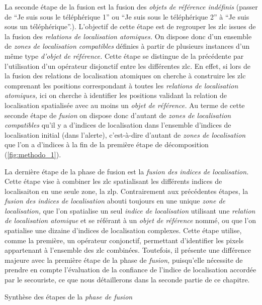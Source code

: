 La seconde étape de la fusion est la fusion des \emph{objets de
  référence indéfinis} (\eg passer de \enquote{Je suis sous le
  téléphérique 1} ou \enquote{Je suis sous le téléphérique 2} à
\enquote{Je suis sous un téléphérique}.). L'objectif de cette étape
est de regrouper les \ac{zlc} issues de la fusion des \emph{relations
  de localisation atomiques.} On dispose donc d'un ensemble de
\emph{zones de localisation compatibles} définies à partir de
plusieurs instances d'un même type \emph{d'objet de référence.} Cette
étape se distingue de la précédente par l'utilisation d'un opérateur
disjonctif entre les différentes \ac{zlc}. En effet, si lors de la
fusion des relations de localisation atomiques on cherche à construire
les \ac{zlc} comprenant les positions correspondant à toutes les
\emph{relations de localisation atomiques,} ici on cherche à
identifier les positions validant la relation de localisation
spatialisée avec au moins un \emph{objet de référence.}
%
Au terme de cette seconde étape de \emph{fusion} on dispose donc
d'autant de \emph{zones de localisation compatibles} qu'il y a
d'indices de localisation dans l'ensemble d'indices de localisation
initial (\ie dans l'alerte), c'est-à-dire d'autant de \emph{zones de
  localisation} que l'on a d'indices à la fin de la première étape de
décomposition (\autoref{fig:methodo_1}).

La dernière étape de la phase de fusion est la \emph{fusion des
  indices de localisation.} Cette étape vise à combiner les \ac{zlc}
spatialisant les différents indices de localisaiton en une seule zone,
la \ac{zlp}. Contrairement aux précédentes étapes, la \emph{fusion des
  indices de localisation} abouti toujours en une unique \emph{zone de
  localisation,} que l'on spatialise un seul \emph{indice de
  localisation} utilisant une \emph{relation de localisation atomique}
et se référant à un \emph{objet de référence} nommé, ou que l'on
spatialise une dizaine d'indices de localisation complexes. Cette
étape utilise, comme la première, un opérateur conjonctif, permettant
d'identifier les pixels appartenant à l'ensemble des \ac{zlc}
combinées. Toutefois, il présente une différence majeure avec la
première étape de la phase de \emph{fusion,} puisqu'elle nécessite de
prendre en compte l'évaluation de la confiance de l'indice de
localisation accordée par le secouriste, ce que nous détaillerons dans
la seconde partie de ce chapitre.

\begin{table}
  \centering
   
   \caption{Synthèse des étapes de la \emph{phase de fusion}}
  \label{tab:comparaison_etapes_fusion}
\end{table}

